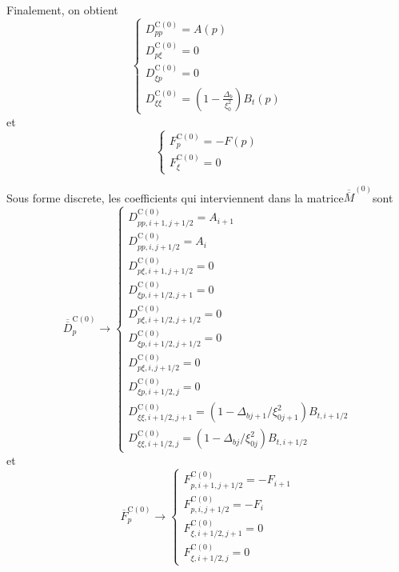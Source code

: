 Finalement, on obtient \[
\left\{ \begin{array}{l}
D_{pp}^{\text{C}(0)}=A(p)\\
D_{p\xi}^{\text{C}(0)}=0\\
D_{\xi p}^{\text{C}(0)}=0\\
D_{\xi\xi}^{\text{C}(0)}=\left(1-\frac{\Delta_{b}}{\xi_{0}^{2}}\right)B_{t}(p)\end{array}\right.\]
et \[
\left\{ \begin{array}{l}
F_{p}^{\text{C}(0)}=-F(p)\\
F_{\xi}^{\text{C}(0)}=0\end{array}\right.\]


Sous forme discrete, les coefficients qui interviennent dans la matrice$\overline{\overline{M}}^{\left(0\right)}$sont
\[
\overline{\overline{D}}_{p}^{\text{C}(0)}\rightarrow\left\{ \begin{array}{l}
D_{pp,i+1,j+1/2}^{\text{C}\left(0\right)}=A_{i+1}\\
D_{pp,i,j+1/2}^{\text{C}\left(0\right)}=A_{i}\\
D_{p\xi,i+1,j+1/2}^{\text{C}\left(0\right)}=0\\
D_{\xi p,i+1/2,j+1}^{\text{C}\left(0\right)}=0\\
D_{p\xi,i+1/2,j+1/2}^{\text{C}\left(0\right)}=0\\
D_{\xi p,i+1/2,j+1/2}^{\text{C}\left(0\right)}=0\\
D_{p\xi,i,j+1/2}^{\text{C}\left(0\right)}=0\\
D_{\xi p,i+1/2,j}^{\text{C}\left(0\right)}=0\\
D_{\xi\xi,i+1/2,j+1}^{\text{C}\left(0\right)}=\left(1-\Delta_{bj+1}/\xi_{0j+1}^{2}\right)B_{t,i+1/2}\\
D_{\xi\xi,i+1/2,j}^{\text{C}\left(0\right)}=\left(1-\Delta_{bj}/\xi_{0j}^{2}\right)B_{t,i+1/2}\end{array}\right.\]
et \[
\overline{F}_{p}^{\text{C}(0)}\rightarrow\left\{ \begin{array}{l}
F_{p,i+1,j+1/2}^{\text{C}(0)}=-F_{i+1}\\
F_{p,i,j+1/2}^{\text{C}(0)}=-F_{i}\\
F_{\xi,i+1/2,j+1}^{\text{C}(0)}=0\\
F_{\xi,i+1/2,j}^{\text{C}(0)}=0\end{array}\right.\]

